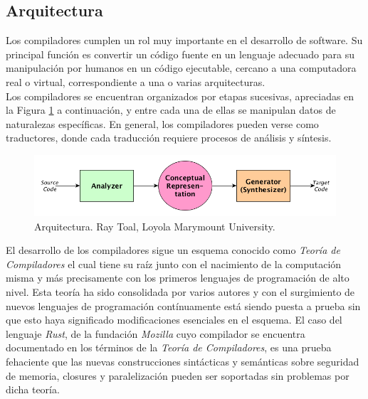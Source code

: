 \subsection{Arquitectura}
Los compiladores cumplen un rol muy importante en el desarrollo de software. Su principal función es convertir un código fuente en un lenguaje adecuado para su manipulación por humanos en un código ejecutable, cercano a una computadora real o virtual, correspondiente a una o varias arquitecturas.\\

Los compiladores se encuentran organizados por etapas sucesivas, apreciadas en la Figura \ref{fig:compiler architecture} a continuación, y entre cada una de ellas se manipulan datos de naturalezas específicas. En general, los compiladores pueden verse como traductores, donde cada traducción requiere procesos de análisis y síntesis.

\begin{figure}[ht]
    \centering
    \includegraphics[scale=0.5]{images/analsyn.png}
    \caption{Arquitectura. Ray Toal, Loyola Marymount University.}
    \label{fig:compiler architecture}
\end{figure}


El desarrollo de los compiladores sigue un esquema conocido como \textit{Teoría de Compiladores} el cual tiene su raíz junto con el nacimiento de la computación misma y más precisamente con los primeros lenguajes de programación de alto nivel. Esta teoría ha sido consolidada por varios autores\cite{aho1990compiladores}\cite{srikant2002compiler}\cite{slonneger1995formal}\cite{aho1990compiladores}\cite{meduna2007elements}\cite{appel2004modern}\cite{morgan1998building}\cite{terry1997compilers}\cite{grune2012modern}\cite{tremblay1985theory}\cite{lee1974anatomy}\cite{cooper2011engineering}\cite{gupta2010compiler}\cite{reps2007program}\cite{mak2011writing}\cite{midkiff2012automatic}\cite{seidl2012compiler}\cite{srikant2002compiler}\cite{su2011principles}\cite{mogensen2017introduction} y con el surgimiento de nuevos lenguajes de programación\cite{dasnois2011haxe}\cite{mccurdy2015haxe}\cite{klabnik2018rust}\cite{matzinger2019hands}\cite{sharma2019mastering}\cite{donovan2015go}\cite{summerfield2012programming}\cite{guney2018hands}\cite{skeen2018kotlin}\cite{adelekan2018kotlin}\cite{yousefkotlin} contínuamente está siendo puesta a prueba sin que esto haya significado modificaciones esenciales en el esquema. El caso del lenguaje \textit{Rust}, de la fundación \textit{Mozilla}\cite{mozillarustdoc} cuyo compilador se encuentra documentado\cite{mozillarustcdoc} en los términos de la \textit{Teoría de Compiladores}, es una prueba fehaciente que las nuevas construcciones sintácticas y semánticas sobre seguridad de memoria, closures y paralelización pueden ser soportadas sin problemas por dicha teoría.\\

